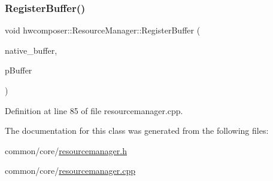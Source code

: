 \subsubsection{\texorpdfstring{Register\+Buffer()}{RegisterBuffer()}}
{\footnotesize\ttfamily void hwcomposer\+::\+Resource\+Manager\+::\+Register\+Buffer (\begin{DoxyParamCaption}\item[{const uint32\+\_\+t \&}]{native\+\_\+buffer,  }\item[{std\+::shared\+\_\+ptr$<$ \mbox{\hyperlink{classhwcomposer_1_1OverlayBuffer}{Overlay\+Buffer}} $>$ \&}]{p\+Buffer }\end{DoxyParamCaption})}



Definition at line 85 of file resourcemanager.\+cpp.


\begin{DoxyCode}{0}
\end{DoxyCode}


The documentation for this class was generated from the following files\+:\begin{DoxyCompactItemize}
\item 
common/core/\mbox{\hyperlink{resourcemanager_8h}{resourcemanager.\+h}}\item 
common/core/\mbox{\hyperlink{resourcemanager_8cpp}{resourcemanager.\+cpp}}\end{DoxyCompactItemize}
